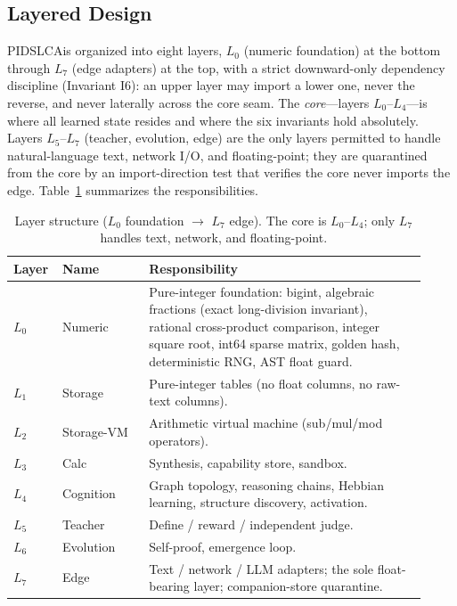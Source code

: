 \documentclass[11pt,a4paper]{article}
\newcommand{\sysname}{PIDSLCA}
\begin{document}
\subsection{Layered Design}
\label{sec:arch-layers}

\sysname is organized into eight layers, $L_0$ (numeric foundation) at the
bottom through $L_7$ (edge adapters) at the top, with a strict
downward-only dependency discipline (Invariant I6): an upper layer may
import a lower one, never the reverse, and never laterally across the
core seam. The \emph{core}---layers $L_0$--$L_4$---is where all learned
state resides and where the six invariants hold absolutely. Layers
$L_5$--$L_7$ (teacher, evolution, edge) are the only layers permitted to
handle natural-language text, network I/O, and floating-point; they are
quarantined from the core by an import-direction test that verifies the
core never imports the edge. Table~\ref{tab:layers} summarizes the
responsibilities.

\begin{table}[t]
\centering
\small
\caption{Layer structure ($L_0$ foundation $\to$ $L_7$ edge). The core is
$L_0$--$L_4$; only $L_7$ handles text, network, and floating-point.}
\label{tab:layers}
\begin{tabular}{@{}p{0.08\linewidth}p{0.20\linewidth}p{0.64\linewidth}@{}}
\toprule
Layer & Name & Responsibility \\
\midrule
$L_0$ & Numeric      & Pure-integer foundation: bigint, algebraic fractions (exact long-division invariant), rational cross-product comparison, integer square root, int64 sparse matrix, golden hash, deterministic RNG, AST float guard. \\
$L_1$ & Storage      & Pure-integer tables (no float columns, no raw-text columns). \\
$L_2$ & Storage-VM   & Arithmetic virtual machine (sub/mul/mod operators). \\
$L_3$ & Calc         & Synthesis, capability store, sandbox. \\
$L_4$ & Cognition    & Graph topology, reasoning chains, Hebbian learning, structure discovery, activation. \\
$L_5$ & Teacher      & Define / reward / independent judge. \\
$L_6$ & Evolution    & Self-proof, emergence loop. \\
$L_7$ & Edge         & Text / network / LLM adapters; the sole float-bearing layer; companion-store quarantine. \\
\bottomrule
\end{tabular}
\end{table}
\end{document}
